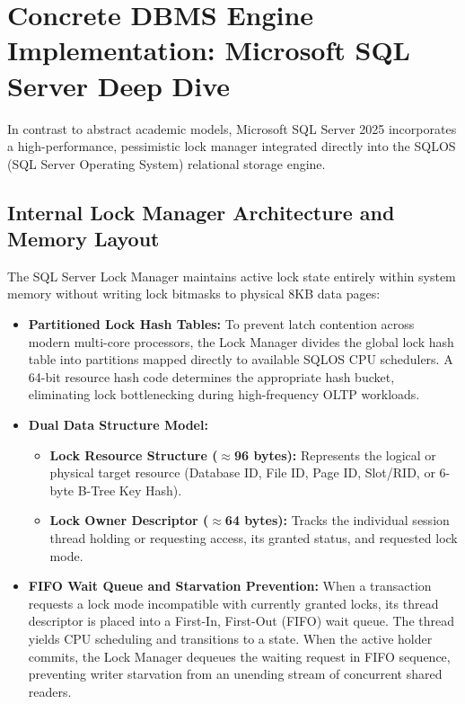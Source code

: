 \section{Concrete DBMS Engine Implementation: Microsoft SQL Server Deep Dive}
In contrast to abstract academic models, Microsoft SQL Server 2025 incorporates a high-performance, pessimistic lock manager integrated directly into the SQLOS (SQL Server Operating System) relational storage engine.

\subsection{Internal Lock Manager Architecture and Memory Layout}
The SQL Server Lock Manager maintains active lock state entirely within system memory without writing lock bitmasks to physical 8KB data pages:
\begin{itemize}
    \item \textbf{Partitioned Lock Hash Tables:} To prevent latch contention across modern multi-core processors, the Lock Manager divides the global lock hash table into partitions mapped directly to available SQLOS CPU schedulers. A 64-bit resource hash code determines the appropriate hash bucket, eliminating lock bottlenecking during high-frequency OLTP workloads.
    \item \textbf{Dual Data Structure Model:}
    \begin{itemize}
        \item \textbf{Lock Resource Structure ($\approx$96 bytes):} Represents the logical or physical target resource (Database ID, File ID, Page ID, Slot/RID, or 6-byte B-Tree Key Hash).
        \item \textbf{Lock Owner Descriptor ($\approx$64 bytes):} Tracks the individual session thread holding or requesting access, its granted status, and requested lock mode.
    \end{itemize}
    \item \textbf{FIFO Wait Queue and Starvation Prevention:} When a transaction requests a lock mode incompatible with currently granted locks, its thread descriptor is placed into a First-In, First-Out (FIFO) wait queue. The thread yields CPU scheduling and transitions to a  state. When the active holder commits, the Lock Manager dequeues the waiting request in FIFO sequence, preventing writer starvation from an unending stream of concurrent shared readers.
\end{itemize}

